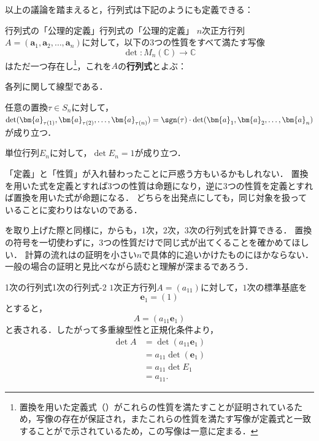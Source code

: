 以上の議論を踏まえると，行列式は下記のようにも定義できる：

\begin{definition}{行列式の「公理的定義」}{行列式の「公理的定義」}
  $n$次正方行列$A = (\bm{a}_1, \bm{a}_2, \dots, \bm{a}_n)$に対して，以下の3つの性質をすべて満たす写像
  \[
  \det \colon M_n(\mathbb{C}) \to \mathbb{C}
  \]
  はただ一つ存在し\footnote{置換を用いた定義式（）がこれらの性質を満たすことが証明されているため，写像の存在が保証され，またこれらの性質を満たす写像が定義式と一致することがで示されているため，この写像は一意に定まる．}，これを$A$の\textbf{行列式}とよぶ：
  \begin{description}[labelwidth=5\zw,leftmargin=!, itemsep=0pt]
   \item [多重線型性]各列に関して線型である．
   \item [交代性]任意の置換$\tau \in S_n$に対して，$\det(\bm{a}_{\tau(1)}, \bm{a}_{\tau(2)}, \dots, \bm{a}_{\tau(n)}) = \sgn(\tau) \cdot \det(\bm{a}_1, \bm{a}_2, \dots, \bm{a}_n)$が成り立つ．
   \item [正規化条件]単位行列$E_n$に対して，$\det E_n = 1$が成り立つ．
  \end{description}
\end{definition}

「定義」と「性質」が入れ替わったことに戸惑う方もいるかもしれない．
置換を用いた式を定義とすれば$3$つの性質は命題になり，逆に$3$つの性質を定義とすれば置換を用いた式が命題になる．
どちらを出発点にしても，同じ対象を扱っていることに変わりはないのである．

を取り上げた際と同様に，からも，$1$次，$2$次，$3$次の行列式を計算できる．
置換の符号を一切使わずに，$3$つの性質だけで同じ式が出てくることを確かめてほしい．
計算の流れはの証明を小さい$n$で具体的に追いかけたものにほかならない．
一般の場合の証明と見比べながら読むと理解が深まるであろう．

\begin{example}{1次の行列式}{1次の行列式-2}
  $1$次正方行列$A=(a_{11})$に対して，$1$次の標準基底を
  \[
    \bm{e}_1=(1)
  \]
  とすると，
  \[
    A=(a_{11}\bm{e}_1)
  \]
  と表される．したがって多重線型性と正規化条件より，
  \begin{align*}
    \det A
    &=\det(a_{11}\bm{e}_1)\\
    &=a_{11}\det(\bm{e}_1)\\
    &=a_{11}\det E_1\\
    &=a_{11}.
  \end{align*}
\end{example}

